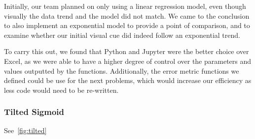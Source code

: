 Initially, our team planned on only using a linear regression model, even though visually the data trend and the model did not match. We came to the conclusion to also implement an exponential model to provide a point of comparison, and to examine whether our initial visual cue did indeed follow an exponential trend.

To carry this out, we found that Python and Jupyter were the better choice over Excel, as we were able to have a higher degree of control over the parameters and values outputted by the functions. Additionally, the error metric functions we defined could be use for the next problems, which would increase our efficiency as less code would need to be re-written.

\subsubsection*{Tilted Sigmoid}

See~\ref{fig:tilted}

